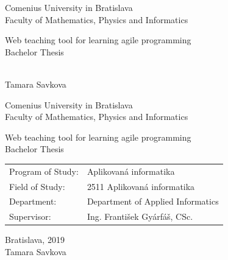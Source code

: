 \documentclass[12pt, oneside]{book}  %
\def\mfrok{2019}
\def\mfnazov{Web teaching tool for learning agile programming}
\def\mftyp{Bachelor Thesis}
\def\mfautor{Tamara Savkova}
\def\mfskolitel{Ing. František Gyárfáš, CSc.}
\def\mfmiesto{Bratislava, \mfrok}
\def\mfodbor{ 2511 Aplikovaná informatika }
\def\program{ Aplikovaná informatika }
\def\mfpracovisko{ Department of Applied Informatics }
\begin{document}
     
\frontmatter


\thispagestyle{empty}

\begin{center}
\sc\large
Comenius University in Bratislava\\
Faculty of Mathematics, Physics and Informatics

\vfill

{\LARGE\mfnazov}\\
\mftyp
\end{center}

\vfill

{\sc\large 
\noindent \mfrok\\
\mfautor
}

\cleardoublepage


\thispagestyle{empty}
\noindent

\begin{center}
\sc  
\large
Comenius University in Bratislava\\
Faculty of Mathematics, Physics and Informatics

\vfill

{\LARGE\mfnazov}\\
\mftyp
\end{center}

\vfill

\noindent
\begin{tabular}{ll}
Program of Study: & \program \\
Field of Study: & \mfodbor \\
Department: & \mfpracovisko \\
Supervisor: & \mfskolitel \\
\end{tabular}

\vfill


\noindent \mfmiesto\\
\mfautor

\cleardoublepage


\end{document}
